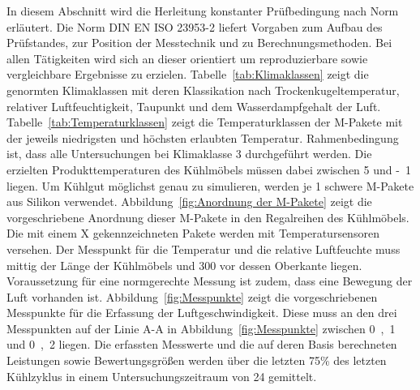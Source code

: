 In diesem Abschnitt wird die Herleitung konstanter Prüfbedingung nach Norm erläutert.
Die Norm DIN EN ISO 23953-2 liefert Vorgaben zum Aufbau des Prüfstandes, zur Position der Messtechnik und zu Berechnungsmethoden. Bei allen Tätigkeiten wird sich an dieser orientiert um reproduzierbare sowie vergleichbare Ergebnisse zu erzielen.
Tabelle~\ref{tab:Klimaklassen} zeigt die genormten Klimaklassen mit deren Klassikation nach Trockenkugeltemperatur, relativer Luftfeuchtigkeit, Taupunkt und dem Wasserdampfgehalt der Luft. Tabelle~\ref{tab:Temperaturklassen} zeigt die Temperaturklassen der M-Pakete mit der jeweils niedrigsten und höchsten erlaubten Temperatur. Rahmenbedingung ist, dass alle Untersuchungen bei Klimaklasse 3 durchgeführt werden. Die erzielten Produkttemperaturen des Kühlmöbels müssen dabei zwischen \unit{5}{\celsius} und \unit{-1}{\celsius} liegen. \newline
Um Kühlgut möglichst genau zu simulieren, werden je \unit{1}{\kilogram} schwere M-Pakete aus Silikon verwendet. Abbildung~\ref{fig:Anordnung der M-Pakete} zeigt die vorgeschriebene Anordnung dieser M-Pakete in den Regalreihen des Kühlmöbels. Die mit einem X gekennzeichneten Pakete werden mit Temperatursensoren versehen.
Der Messpunkt für die Temperatur und die relative Luftfeuchte muss mittig der Länge der Kühlmöbels und \unit{300}{\milli\metre} vor dessen Oberkante liegen. \newline
Voraussetzung für eine normgerechte Messung ist zudem, dass eine Bewegung der Luft vorhanden ist. Abbildung~\ref{fig:Messpunkte} zeigt die vorgeschriebenen Messpunkte für die Erfassung der Luftgeschwindigkeit. Diese muss an den drei Messpunkten auf der Linie A-A in Abbildung~\ref{fig:Messpunkte} zwischen \unit{0,1}{\meter\per\second} und \unit{0,2}{\meter\per\second} liegen\cite{DINDeutschesInstitutfurNormunge.V..}. \newline
Die erfassten Messwerte und die auf deren Basis berechneten Leistungen sowie Bewertungsgrößen werden über die letzten \unit{75}{\%} des letzten Kühlzyklus in einem Untersuchungszeitraum von \unit{24}{\hour} gemittelt.





